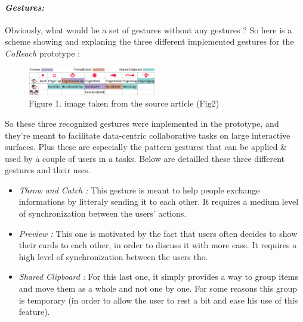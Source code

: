     \paragraph{\textit{Gestures:} \newline}
    \indent \indent Obviously, what would be a set of gestures without any gestures ? So here is a scheme showing and explaning the three different
    implemented gestures for the \textit{CoReach} prototype :
    
                
    \begin{figure}[h]
        \centering
        \includegraphics[width=0.5\textwidth]{images/RecognizedGestures.png}
        \caption{Figure 1. image taken from the source article (Fig2)}
        \label{fig:myimage}
    \end{figure}
    
    \indent \indent So these three recognized gestures were implemented in the prototype, and they're meant to facilitate data-centric
    collaborative tasks on large interactive surfaces. Plus these are especially the pattern gestures that can be applied \& used by a couple of users in a 
    tasks. Below are detailled these three different gestures and their uses.

    \begin{itemize}
        \item \textit{Throw and Catch :} This gesture is meant to help people exchange informations by litteraly sending it to each other. It requires a medium level of 
                                        synchronization between the users' actions. 
        \item \textit{Preview :} This one is motivated by the fact that users often decides to show their cards to each other, in order to discuss it with more ease. It 
                                requires a high level of synchronization between the users tho. 
        \item \textit{Shared Clipboard :} For this last one, it simply provides a way to group items and move them as a whole and not one by one. For some reasons this group is 
                                        temporary (in order to allow the user to rest a bit and ease his use of this feature).
    \end{itemize}


